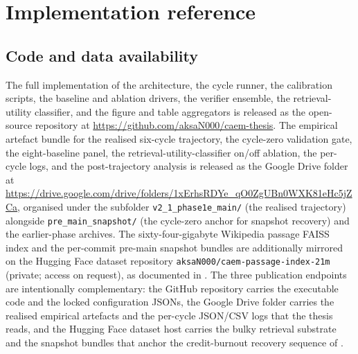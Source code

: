 
\chapter{Implementation reference}
\label{app:implementation}

\section{Code and data availability}
\label{app:code-data-availability}

The full implementation of the architecture, the cycle runner, the calibration scripts, the baseline and ablation drivers, the verifier ensemble, the retrieval-utility classifier, and the figure and table aggregators is released as the open-source repository at \url{https://github.com/aksaN000/caem-thesis}. The empirical artefact bundle for the realised six-cycle trajectory, the cycle-zero validation gate, the eight-baseline panel, the retrieval-utility-classifier on/off ablation, the per-cycle logs, and the post-trajectory analysis is released as the Google Drive folder at \url{https://drive.google.com/drive/folders/1xErhsRDYe_qO0ZgUBn0WXK81eHc5jZCa}, organised under the subfolder \texttt{v2\_1\_phase1e\_main/} (the realised trajectory) alongside \texttt{pre\_main\_snapshot/} (the cycle-zero anchor for snapshot recovery) and the earlier-phase archives. The sixty-four-gigabyte Wikipedia passage FAISS index and the per-commit pre-main snapshot bundles are additionally mirrored on the Hugging Face dataset repository \texttt{aksaN000/caem-passage-index-21m} (private; access on request), as documented in . The three publication endpoints are intentionally complementary: the GitHub repository carries the executable code and the locked configuration JSONs, the Google Drive folder carries the realised empirical artefacts and the per-cycle JSON/CSV logs that the thesis reads, and the Hugging Face dataset host carries the bulky retrieval substrate and the snapshot bundles that anchor the credit-burnout recovery sequence of .

